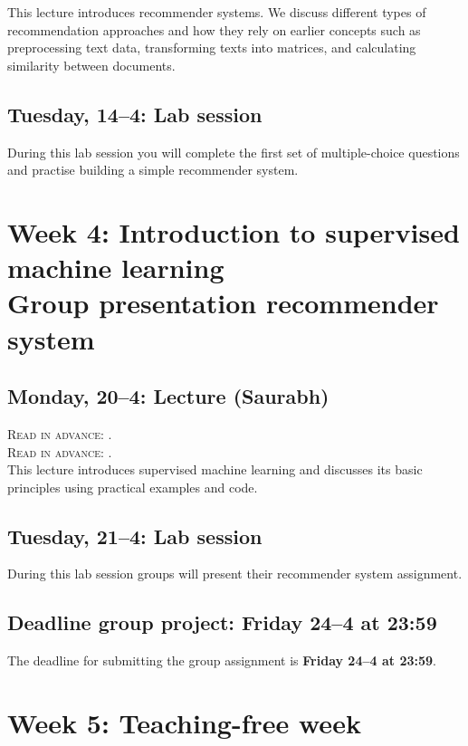 This lecture introduces recommender systems. We discuss different types of recommendation approaches and how they rely on earlier concepts such as preprocessing text data, transforming texts into matrices, and calculating similarity between documents.

\subsection*{Tuesday, 14--4: Lab session}

During this lab session you will complete the first set of multiple-choice questions and practise building a simple recommender system.

\section*{Week 4: Introduction to supervised machine learning \\ Group presentation recommender system}

\subsection*{Monday, 20--4: Lecture (Saurabh)}

\textsc{ Read in advance: \cite{vermeer_seeing_2019}.}\\
\textsc{ Read in advance: \cite{meppelink_reliable_2021}.}\\

This lecture introduces supervised machine learning and discusses its basic principles using practical examples and code.

\subsection*{Tuesday, 21--4: Lab session}

During this lab session groups will present their recommender system assignment.

\subsection*{Deadline group project: Friday 24--4 at 23:59}

The deadline for submitting the group assignment is \textbf{Friday 24--4 at 23:59}.

\section*{Week 5: Teaching-free week}


